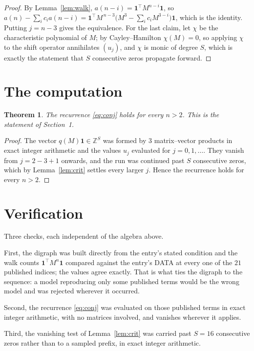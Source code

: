 \documentclass[11pt,a4paper]{article}
\theoremstyle{plain}
\newtheorem{theorem}{Theorem}
\theoremstyle{definition}
\begin{document}
\begin{proof}
By Lemma~\ref{lem:walk}, $a(n-i)=\mathbf{1}^{\!\top}M^{n-i}\mathbf{1}$, so
$a(n)-\sum_i c_i a(n-i)
=\mathbf{1}^{\!\top}M^{\,n-3}\bigl(M^{3}-\sum_i c_i M^{3-i}\bigr)
\mathbf{1}$, which is the identity. Putting $j=n-3$ gives the equivalence. For the
last claim, let $\chi$ be the characteristic polynomial of $M$; by Cayley--Hamilton
$\chi(M)=0$, so applying $\chi$ to the shift operator annihilates $(u_j)$, and $\chi$ is
monic of degree $S$, which is exactly the statement that $S$ consecutive zeros propagate
forward.
\end{proof}

\section{The computation}

\begin{theorem}
The recurrence \eqref{eq:conj} holds for every $n>2$. This is the statement of
Section~1.
\end{theorem}

\begin{proof}
The vector $q(M)\mathbf{1}\in\mathbb{Z}^{S}$ was formed by $3$ matrix--vector
products in exact integer arithmetic and the values $u_j$ evaluated for
$j=0,1,\dots$. They vanish from $j=2-3+1$ onwards, and the run was continued past
$S$ consecutive zeros, which by Lemma~\ref{lem:crit} settles every larger $j$. Hence the
recurrence holds for every $n>2$.
\end{proof}

\section{Verification}

Three checks, each independent of the algebra above.

First, the digraph was built directly from the entry's stated condition and the walk counts
$\mathbf{1}^{\!\top}M^{n}\mathbf{1}$ compared against the entry's DATA at every one of
the $21$ published indices; the values agree exactly. That is what ties the digraph to
the sequence: a model reproducing only some published terms would be the wrong model and
was rejected wherever it occurred.

Second, the recurrence \eqref{eq:conj} was evaluated on those published terms in exact
integer arithmetic, with no matrices involved, and vanishes wherever it applies.

Third, the vanishing test of Lemma~\ref{lem:crit} was carried past $S=16$ consecutive
zeros rather than to a sampled prefix, in exact integer arithmetic.
\end{document}
